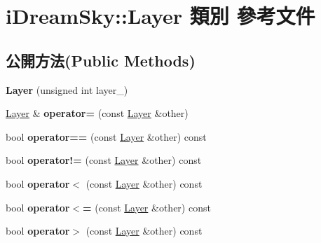 \hypertarget{classi_dream_sky_1_1_layer}{}\section{i\+Dream\+Sky\+:\+:Layer 類別 參考文件}
\label{classi_dream_sky_1_1_layer}
\subsection*{公開方法(Public Methods)}
\begin{DoxyCompactItemize}
\item 
{\bfseries Layer} (unsigned int layer\+\_\+)\hypertarget{classi_dream_sky_1_1_layer_a9536e86d2c19f61711a7b743290cb090}{}\label{classi_dream_sky_1_1_layer_a9536e86d2c19f61711a7b743290cb090}

\item 
\hyperlink{classi_dream_sky_1_1_layer}{Layer} \& {\bfseries operator=} (const \hyperlink{classi_dream_sky_1_1_layer}{Layer} \&other)\hypertarget{classi_dream_sky_1_1_layer_a87d3ea2ca016510f11f604ecbb1a5fb2}{}\label{classi_dream_sky_1_1_layer_a87d3ea2ca016510f11f604ecbb1a5fb2}

\item 
bool {\bfseries operator==} (const \hyperlink{classi_dream_sky_1_1_layer}{Layer} \&other) const \hypertarget{classi_dream_sky_1_1_layer_a8e92c4050c65f0716056ead2596b267a}{}\label{classi_dream_sky_1_1_layer_a8e92c4050c65f0716056ead2596b267a}

\item 
bool {\bfseries operator!=} (const \hyperlink{classi_dream_sky_1_1_layer}{Layer} \&other) const \hypertarget{classi_dream_sky_1_1_layer_a291ed0962dcbfc3d9bb61a7f73032afd}{}\label{classi_dream_sky_1_1_layer_a291ed0962dcbfc3d9bb61a7f73032afd}

\item 
bool {\bfseries operator$<$} (const \hyperlink{classi_dream_sky_1_1_layer}{Layer} \&other) const \hypertarget{classi_dream_sky_1_1_layer_a852fd88c0dc690b456c9c48e4dfa9de5}{}\label{classi_dream_sky_1_1_layer_a852fd88c0dc690b456c9c48e4dfa9de5}

\item 
bool {\bfseries operator$<$=} (const \hyperlink{classi_dream_sky_1_1_layer}{Layer} \&other) const \hypertarget{classi_dream_sky_1_1_layer_a6f28ee4c27eb68b5d2b8f91b8af15499}{}\label{classi_dream_sky_1_1_layer_a6f28ee4c27eb68b5d2b8f91b8af15499}

\item 
bool {\bfseries operator$>$} (const \hyperlink{classi_dream_sky_1_1_layer}{Layer} \&other) const \hypertarget{classi_dream_sky_1_1_layer_aeb9925ef7a43eee5e0477a9596946a26}{}\label{classi_dream_sky_1_1_layer_aeb9925ef7a43eee5e0477a9596946a26}


\end{DoxyCompactItemize}
